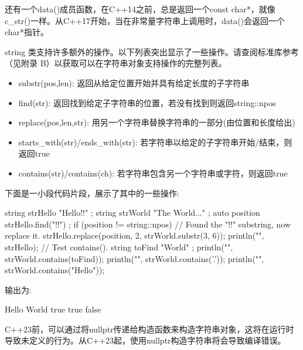 还有一个data()成员函数，在C++14之前，总是返回一个const char*，就像c\_str()一样。从C++17开始，当在非常量字符串上调用时，data()会返回一个char*指针。


string 类支持许多额外的操作。以下列表突出显示了一些操作。请查阅标准库参考（见附录 B）以获取可以在字符串对象支持操作的完整列表。


\begin{itemize}
\item
substr(pos,len): 返回从给定位置开始并具有给定长度的子字符串

\item
find(str): 返回找到给定子字符串的位置，若没有找到则返回string::npos

\item
replace(pos,len,str): 用另一个字符串替换字符串的一部分(由位置和长度给出)

\item
starts\_with(str)/ends\_with(str): 若字符串以给定的子字符串开始/结束，则返回true

\item
contains(str)/contains(ch): 若字符串包含另一个字符串或字符，则返回true
\end{itemize}

下面是一小段代码片段，展示了其中的一些操作:

\begin{cpp}
string strHello { "Hello!!" };
string strWorld { "The World..." };
auto position { strHello.find("!!") };
if (position != string::npos) {
    // Found the "!!" substring, now replace it.
    strHello.replace(position, 2, strWorld.substr(3, 6));
}
println("{}", strHello);
// Test contains().
string toFind { "World" };
println("{}", strWorld.contains(toFind));
println("{}", strWorld.contains('.'));
println("{}", strWorld.contains("Hello"));
\end{cpp}

输出为:

\begin{shell}
Hello World
true
true
false
\end{shell}


C++23前，可以通过将nullptr传递给构造函数来构造字符串对象，这将在运行时导致未定义的行为。从C++23起，使用nullptr构造字符串将会导致编译错误。


